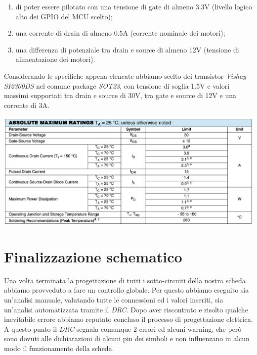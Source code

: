 \begin{enumerate}
\def\labelenumi{\arabic{enumi}.}
\item
  
  di poter essere pilotato con una tensione di gate di almeno 3.3V
  (livello logico alto dei GPIO del MCU scelto);
  
\item
  
  una corrente di drain di almeno 0.5A (corrente nominale dei motori);
  
\item
  
  una differenza di potenziale tra drain e source di almeno 12V
  (tensione di alimentazione dei motori).
  
\end{enumerate}

\noindent Considerando le specifiche appena elencate abbiamo scelto dei transistor
\textit{Vishay SI2300DS} nel comune package \textit{SOT23}, con tensione di soglia 1.5V e
valori massimi supportati tra drain e source di 30V, tra gate e source
di 12V e una corrente di 3A.

\begin{center}
\includegraphics[scale=0.5]{figures/image69.png}
\captionsetup{type=figure}
\end{center}

\hypertarget{finalizzazione schematico}{%
\section{Finalizzazione schematico}\label{finalizzazione schematico}}

Una volta terminata la progettazione di tutti i sotto-circuiti della 
nostra scheda abbiamo provveduto a fare un controllo globale. Per questo abbiamo eseguito 
sia un’analisi manuale, valutando tutte le connessioni ed i valori inseriti, sia un’analisi 
automatizzata tramite il \textit{DRC}. Dopo aver riscontrato e risolto qualche inevitabile errore 
abbiamo reputato concluso il processo di progettazione elettrica. A questo punto il \textit{DRC} 
segnala comunque 2 errori ed alcuni warning, che però sono dovuti alle dichiarazioni di alcuni 
pin dei simboli e non influenzano in alcun modo il funzionamento della scheda.
